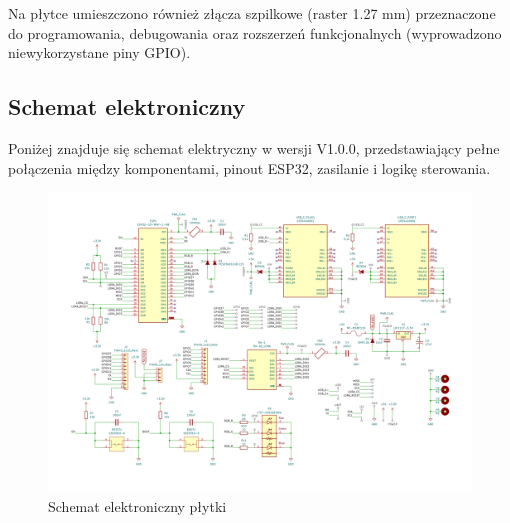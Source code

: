 Na płytce umieszczono również złącza szpilkowe (raster 1.27 mm) przeznaczone do programowania, debugowania oraz rozszerzeń funkcjonalnych (wyprowadzono niewykorzystane piny GPIO).

\clearpage
\subsection{Schemat elektroniczny}

Poniżej znajduje się schemat elektryczny w wersji V1.0.0, przedstawiający pełne połączenia między komponentami, pinout ESP32, zasilanie i logikę sterowania.

\begin{figure}[htbp]
\centering
	\includegraphics[width=\textwidth]{root/pcb_schematic.png}
	\caption{Schemat elektroniczny płytki}
\end{figure}

